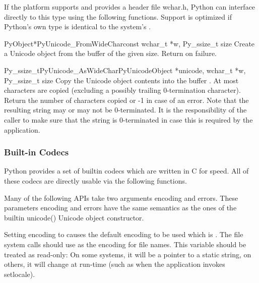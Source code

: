 If the platform supports  and provides a header file
wchar.h, Python can interface directly to this type using the
following functions. Support is optimized if Python's own
 type is identical to the system's .

\begin{cfuncdesc}{PyObject*}{PyUnicode_FromWideChar}{const wchar_t *w,
                                                     Py_ssize_t size}
  Create a Unicode object from the  buffer  of
  the given size.  Return \NULL{} on failure.
\end{cfuncdesc}

\begin{cfuncdesc}{Py_ssize_t}{PyUnicode_AsWideChar}{PyUnicodeObject *unicode,
                                             wchar_t *w,
                                             Py_ssize_t size}
  Copy the Unicode object contents into the  buffer
  .  At most   characters are copied
  (excluding a possibly trailing 0-termination character).  Return
  the number of  characters copied or -1 in case of an
  error.  Note that the resulting  string may or may
  not be 0-terminated.  It is the responsibility of the caller to make
  sure that the  string is 0-terminated in case this is
  required by the application.
\end{cfuncdesc}


\subsubsection{Built-in Codecs \label{builtinCodecs}}

Python provides a set of builtin codecs which are written in C
for speed. All of these codecs are directly usable via the
following functions.

Many of the following APIs take two arguments encoding and
errors. These parameters encoding and errors have the same semantics
as the ones of the builtin unicode() Unicode object constructor.

Setting encoding to \NULL{} causes the default encoding to be used
which is \ASCII.  The file system calls should use
 as the encoding for file
names. This variable should be treated as read-only: On some systems,
it will be a pointer to a static string, on others, it will change at
run-time (such as when the application invokes setlocale).

